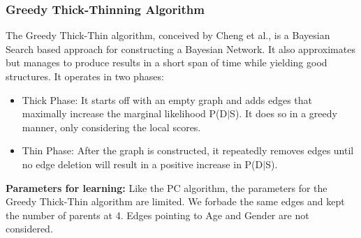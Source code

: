 \documentclass[conference]{IEEEtran}
\begin{document}
\subsubsection{Greedy Thick-Thinning Algorithm}
The Greedy Thick-Thin algorithm, conceived by Cheng et al., is a Bayesian Search based approach for constructing a Bayesian Network. It also approximates but manages to produce results in a short span of time while yielding good structures. It operates in two phases:
\begin{itemize}
    \item Thick Phase: It starts off with an empty graph and adds edges that maximally increase the marginal likelihood P(D$|$S). It does so in a greedy manner, only considering the local scores.
    \item Thin Phase: After the graph is constructed, it repeatedly removes edges until no edge deletion will result in a positive increase in P(D$|$S). 
\end{itemize}
\textbf{Parameters for learning:}
Like the PC algorithm, the parameters for the Greedy Thick-Thin algorithm are limited. We forbade the same edges and kept the number of parents at 4. Edges pointing to Age and Gender are not considered. 

\begin{table}[h!]
\centering
\caption{Greedy Thick-Thinning Algorithm Parameters}
\label{tab:greedy_tt_results}
\renewcommand{\arraystretch}{1.3}
\end{table}
\end{document}

